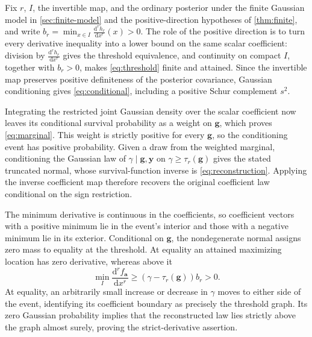 \begin{proofEnd}
Fix $r$, $I$, the invertible map, and the ordinary posterior under
the finite Gaussian model in \cref{sec:finite-model} and the
positive-direction hypotheses of
\cref{thm:finite}, and write
$b_r=\min_{x\in I}\frac{\mathrm{d}^rh_r}{\mathrm{d}x^r}(x)>0$.
The role of the positive direction is to turn every
derivative inequality into a lower bound on the same scalar coefficient:
division by $\frac{\mathrm{d}^rh_r}{\mathrm{d}x^r}$ gives the threshold equivalence,
and continuity on compact $I$, together with $b_r>0$, makes
\cref{eq:threshold} finite and attained. Since the invertible map
preserves positive definiteness of the posterior covariance, Gaussian conditioning
\citep[Section 2.2]{rasmussen2006gpml} gives
\cref{eq:conditional}, including a positive Schur complement $s^2$.

Integrating the restricted joint Gaussian density over the scalar
coefficient now leaves its conditional survival probability as a
weight on $\boldsymbol g$, which proves \cref{eq:marginal}.
This weight is strictly positive for every $\boldsymbol g$, so the
conditioning event has positive probability. Given a draw from the
weighted marginal, conditioning the Gaussian law of
$\gamma\mid\boldsymbol g,\boldsymbol y$ on
$\gamma\geq\tau_r(\boldsymbol g)$ gives the stated truncated normal,
whose survival-function inverse is \cref{eq:reconstruction}.
Applying the inverse coefficient map therefore recovers the original
coefficient law conditional on the sign restriction.

The minimum derivative is continuous in the coefficients, so coefficient
vectors with a positive minimum lie in the event's interior and those
with a negative minimum lie in its exterior. Conditional on
$\boldsymbol g$, the nondegenerate normal assigns zero
mass to equality at the threshold. At equality an attained maximizing
location has zero derivative, whereas above it
\[
 \min_I\frac{\mathrm{d}^rf_{\boldsymbol a}}{\mathrm{d}x^r}
 \geq(\gamma-\tau_r(\boldsymbol g))b_r>0.
\]
At equality, an arbitrarily small increase or decrease in $\gamma$
moves to either side of the event, identifying its coefficient boundary
as precisely the threshold graph.
Its zero Gaussian probability implies that the reconstructed law lies
strictly above the graph almost surely, proving the strict-derivative
assertion.
\end{proofEnd}
